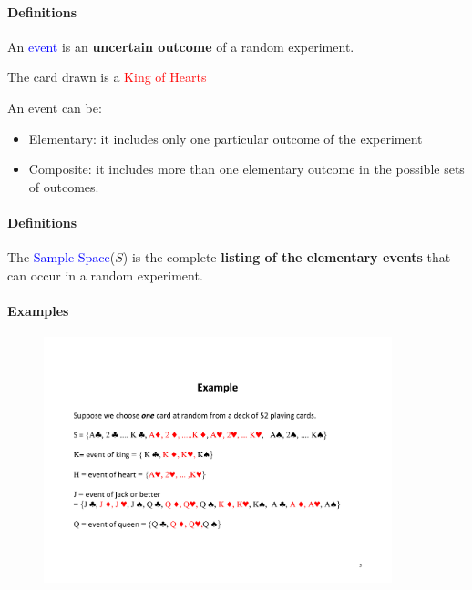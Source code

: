 \documentclass[notes=show]{beamer}\usepackage[]{graphicx}\usepackage[]{color}
\begin{document}
\begin{frame}{\secname}
  \framesubtitle{Definitions}
  \begin{definition}
  An \textcolor{blue}{event} is an \textbf{uncertain outcome} of a random experiment.
  \end{definition}
  \pause
  \begin{example}
    \begin{center}
    The card drawn is a \textcolor{red}{King of Hearts}
    \end{center}
  \end{example}
  \pause
  An event can be:
  \begin{itemize}
  \item Elementary: it includes only one particular outcome of the experiment
  \item Composite: it includes more than one elementary outcome in the possible sets of outcomes.
  \end{itemize}
\end{frame}

\begin{frame}{\secname}
\framesubtitle{Definitions}
  \begin{definition}
  The \textcolor{blue}{Sample Space}($S$) is the complete \textbf{listing of the elementary events} that can occur in a random experiment.
  \end{definition}
\end{frame}

\begin{frame}{\secname}
\framesubtitle{Examples}
  \begin{example}
  \begin{figure}[h!]
  \centering
  \includegraphics[width=0.9\textwidth,height=0.55\textheight]{img/Example1_GE.pdf}
  \end{figure}
  \end{example}
\end{frame}
\end{document}
